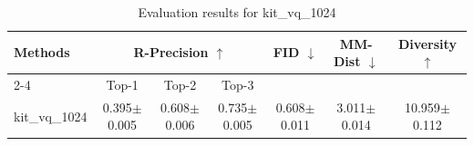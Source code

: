 \begin{table}[h]
\centering
\begin{tabular}{l ccc ccc}
\toprule
\multirow{2}{*}{\textbf{Methods}} & \multicolumn{3}{c}{\textbf{R-Precision $\uparrow$}} & \multirow{2}{*}{\textbf{FID $\downarrow$}} & \multirow{2}{*}{\textbf{MM-Dist $\downarrow$}} & \multirow{2}{*}{\textbf{Diversity $\uparrow$}} \\
\cmidrule(lr){2-4}
& Top-1 & Top-2 & Top-3 & & & \\
\midrule
kit_vq_1024 & 0.395$\pm$0.005 & 0.608$\pm$0.006 & 0.735$\pm$0.005 & 0.608$\pm$0.011 & 3.011$\pm$0.014 & 10.959$\pm$0.112 \\
\bottomrule
\end{tabular}
\caption{Evaluation results for kit_vq_1024}
\label{tab:results_kit_vq_1024}
\end{table}
